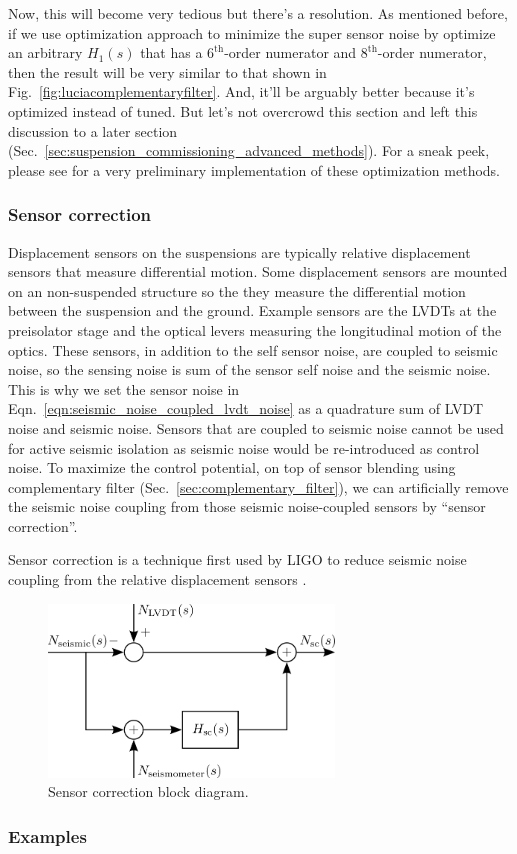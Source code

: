 Now, this will become very tedious but there's a resolution.
As mentioned before, if we use optimization approach to minimize the super sensor noise by optimize an arbitrary $H_1(s)$ that has a $6^\mathrm{th}$-order numerator and $8^\mathrm{th}$-order numerator, then the result will be very similar to that shown in Fig.~\ref{fig:luciacomplementaryfilter}.
And, it'll be arguably better because it's optimized instead of tuned.
But let's not overcrowd this section and left this discussion to a later section (Sec.~\ref{sec:suspension_commissioning_advanced_methods}).
For a sneak peek, please see \cite{srm_inertial_damping, discussion_on_vis_inertial_sensor} for a very preliminary implementation of these optimization methods.

\subsubsection{Sensor correction \label{sec:sensor_correction}}
Displacement sensors on the suspensions are typically relative displacement sensors that measure differential motion.
Some displacement sensors are mounted on an non-suspended structure so the they measure the differential motion between the suspension and the ground.
Example sensors are the LVDTs at the preisolator stage and the optical levers measuring the longitudinal motion of the optics.
These sensors, in addition to the self sensor noise, are coupled to seismic noise, so the sensing noise is sum of the sensor self noise and the seismic noise.
This is why we set the sensor noise in Eqn.~\eqref{eqn:seismic_noise_coupled_lvdt_noise} as a quadrature sum of LVDT noise and seismic noise.
Sensors that are coupled to seismic noise cannot be used for active seismic isolation as seismic noise would be re-introduced as control noise.
To maximize the control potential, on top of sensor blending using complementary filter (Sec.~\eqref{sec:complementary_filter}), we can artificially remove the seismic noise coupling from those seismic noise-coupled sensors by ``sensor correction''.

Sensor correction is a technique first used by LIGO to reduce seismic noise coupling from the relative displacement sensors \cite{Matichard_2015}.
\begin{figure}
	\centering
	\includegraphics[width=76mm]{figures/sensor_correction}
	\caption{Sensor correction block diagram.}
	\label{fig:sensorcorrection}
\end{figure}

\subsubsection{Examples \label{sec:sensor_fusion_examples}}